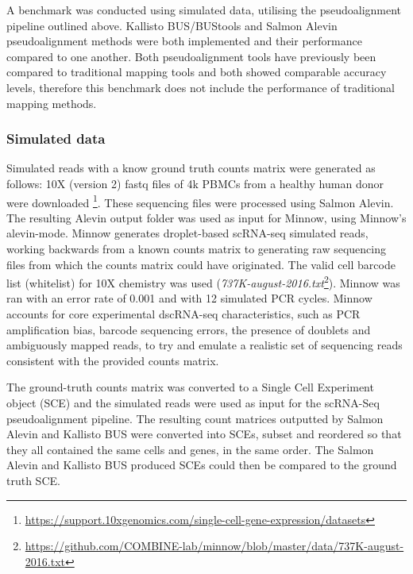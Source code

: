 A benchmark was conducted using simulated data, utilising the pseudoalignment pipeline outlined above.
Kallisto BUS/BUStools and Salmon Alevin pseudoalignment methods were both implemented and their performance compared to one another.
Both pseudoalignment tools have previously been compared to traditional mapping tools\cite{melsted2018barcode, srivastava2019alevin} and both showed comparable accuracy levels, therefore this benchmark does not include the performance of traditional mapping methods.

\subsubsection{Simulated data}
Simulated reads with a know ground truth counts matrix were generated as follows:
10X (version 2) fastq files of 4k PBMCs from a healthy human donor were downloaded  \footnote{\url{https://support.10xgenomics.com/single-cell-gene-expression/datasets}}.
These sequencing files were processed using Salmon Alevin.
The resulting Alevin output folder was used as input for Minnow, using Minnow's alevin-mode.
Minnow generates droplet-based scRNA-seq simulated reads, working backwards from a known counts matrix to generating raw sequencing files from which the counts matrix could have originated.
The valid cell barcode list (whitelist) for 10X chemistry was used (\textit{737K-august-2016.txt}\footnote{\url{https://github.com/COMBINE-lab/minnow/blob/master/data/737K-august-2016.txt}}).
Minnow was ran with an error rate of 0.001 and with 12 simulated PCR cycles.
Minnow accounts for core experimental dscRNA-seq characteristics, such as PCR amplification bias, barcode sequencing errors, the presence of doublets and ambiguously mapped reads, to try and emulate a realistic set of sequencing reads consistent with the provided counts matrix.

The ground-truth counts matrix was converted to a Single Cell Experiment object (SCE) and the simulated reads were used as input for the scRNA-Seq pseudoalignment pipeline.
The resulting count matrices outputted by Salmon Alevin and Kallisto BUS were converted into SCEs, subset and reordered so that they all contained the same cells and genes, in the same order.
The Salmon Alevin and Kallisto BUS produced SCEs could then be compared to the ground truth SCE.

